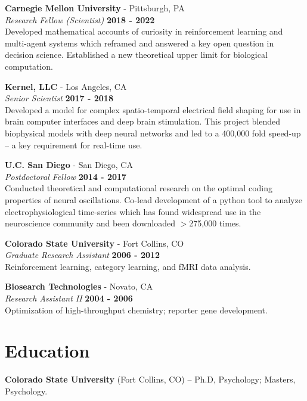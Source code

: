 \documentclass[margin,line]{res}
\begin{document}
\begin{resume}
\vspace{-.1cm}
{\bf Carnegie Mellon University} - Pittsburgh, PA \\
{\em Research Fellow (Scientist)} \hfill {\bf 2018 - 2022}\\
Developed mathematical accounts of curiosity in reinforcement learning and multi-agent systems which reframed and answered a key open question in decision science. Established a new theoretical upper limit for biological computation. 

\vspace{-.1cm}
{\bf Kernel, LLC} - Los Angeles, CA\\
{\em Senior Scientist} \hfill {\bf 2017 - 2018}\\
Developed a model for complex spatio-temporal electrical field shaping for use in brain computer interfaces and deep brain stimulation. This project blended biophysical models with deep neural networks and led to a 400,000 fold speed-up -- a key requirement for real-time use.

\vspace{-.1cm}
{\bf U.C. San Diego} - San Diego, CA\\
{\em Postdoctoral Fellow} \hfill {\bf 2014 - 2017}\\
Conducted theoretical and computational research on the optimal coding properties of neural oscillations. Co-lead development of a python tool to analyze electrophysiological time-series which has found widespread use in the neuroscience community and been downloaded $>$275,000 times.

\vspace{-.1cm}
{\bf Colorado State University} - Fort Collins, CO\\
{\em Graduate Research Assistant} \hfill {\bf 2006 - 2012}\\
Reinforcement learning, category learning, and fMRI data analysis.

\vspace{-.1cm}
{\bf Biosearch Technologies} - Novato, CA\\
{\em Research Assistant II} \hfill {\bf 2004 - 2006}\\
Optimization of high-throughput chemistry; reporter gene development.

\vspace{-.2cm}
\section{\sc Education}
{\bf Colorado State University} (Fort Collins, CO) --  Ph.D, Psychology; Masters, Psychology.\\
\vspace*{-.15in}


\end{resume}
\end{document}
